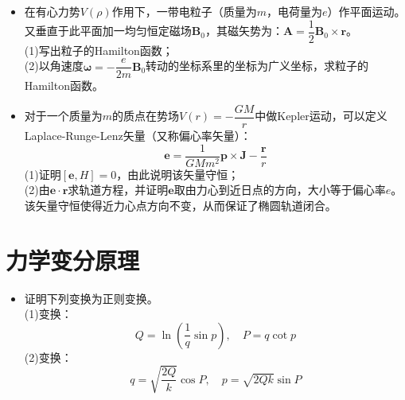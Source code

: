 \documentclass[a4paper,fontset=windows]{ctexart}
\begin{document}
\begin{itemize}
    \item[6.5]
    在有心力势$V(\rho)$作用下，一带电粒子（质量为$m$，电荷量为$e$）作平面运动。又垂直于此平面加一均匀恒定磁场$\bm{B}_0$，其磁矢势为：$\bm{A}=\dfrac{1}{2}\bm{B}_0\times\bm{r}$。 \\
    (1)写出粒子的Hamilton函数； \\
    (2)以角速度$\bm{\omega}=-\dfrac{e}{2m}\bm{B}_0$转动的坐标系里的坐标为广义坐标，求粒子的Hamilton函数。

    \item[6.6]
    对于一个质量为$m$的质点在势场$V(r)=-\dfrac{GM}{r}$中做Kepler运动，可以定义Laplace-Runge-Lenz矢量（又称偏心率矢量）：
    \[
    \bm{e} = \frac{1}{GMm^2}\bm{p}\times\bm{J}-\frac{\bm{r}}{r}
    \]
    (1)证明$[\bm{e},H]=0$，由此说明该矢量守恒； \\
    (2)由$\bm{e}\cdot\bm{r}$求轨道方程，并证明$\bm{e}$取由力心到近日点的方向，大小等于偏心率$e$。该矢量守恒使得近力心点方向不变，从而保证了椭圆轨道闭合。
    \end{itemize}

    \section*{力学变分原理}

    \begin{itemize}

    \item[6.5]
    证明下列变换为正则变换。 \\
    (1)变换：
    \[
    Q=\ln\left(\dfrac{1}{q}\sin p\right),\quad P=q\cot p
    \]
    (2)变换：
    \[
        q=\sqrt{\dfrac{2Q}{k}}\cos P,\quad p=\sqrt{2Qk}\sin P
    \]

    \end{itemize}
\end{document}

